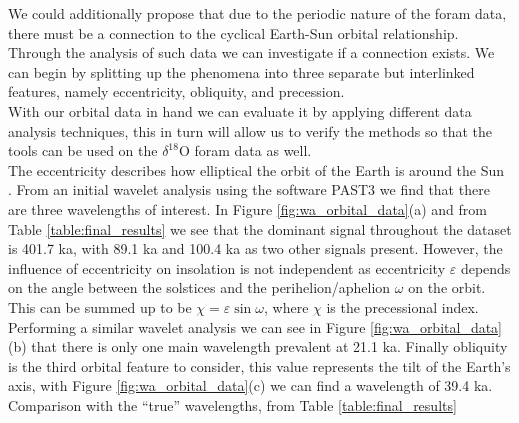 \documentclass[12pt, onecolumn]{revtex4}    %
\begin{document}

We could additionally propose that due to the periodic nature of the foram data, there must be a connection to the cyclical Earth-Sun orbital relationship. Through the analysis of such data we can investigate if a connection exists. We can begin by splitting up the phenomena into three separate but interlinked features, namely eccentricity, obliquity, and precession. \\


With our orbital data in hand we can evaluate it by applying different data analysis techniques, this in turn will allow us to verify the methods so that the tools can be used on the $\delta^{18}$O foram data as well. \\

The eccentricity describes how elliptical the orbit of the Earth is around the Sun \cite{carroll_astro}. From an initial wavelet analysis using the software PAST3 \cite{past3} we find that there are three wavelengths of interest. In Figure \ref{fig:wa_orbital_data}(a) and from Table \ref{table:final_results} we see that the dominant signal throughout the dataset is 401.7 ka, with 89.1 ka and 100.4 ka as two other signals present. However, the influence of eccentricity on insolation is not independent as eccentricity $\varepsilon$ depends on the angle between the solstices and the perihelion/aphelion $\omega$ on the orbit. This can be summed up to be $\chi= \varepsilon \sin{\omega}$, where $\chi$ is the precessional index. Performing a similar wavelet analysis we can see in Figure \ref{fig:wa_orbital_data}(b) that there is only one main wavelength prevalent at 21.1 ka. Finally obliquity is the third orbital feature to consider, this value represents the tilt of the Earth's axis, with Figure \ref{fig:wa_orbital_data}(c) we can find a wavelength of 39.4 ka. \\ 

Comparison with the ``true'' wavelengths, from Table \ref{table:final_results} 

\newpage





\newpage
\end{document}
